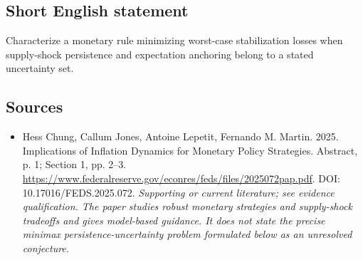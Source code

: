\documentclass[11pt]{article}
\begin{document}
\subsection{Short English statement}
Characterize a monetary rule minimizing worst-case stabilization losses when supply-shock persistence and expectation anchoring belong to a stated uncertainty set.

\subsection{Sources}
\begin{itemize}\raggedright
\item[\textnormal{[S1]}]\hypertarget{source:30007529:1}{} Hess Chung, Callum Jones, Antoine Lepetit, Fernando M. Martin. 2025. Implications of Inflation Dynamics for Monetary Policy Strategies. Abstract, p. 1; Section 1, pp. 2–3.
\url{https://www.federalreserve.gov/econres/feds/files/2025072pap.pdf}.
DOI: 10.17016/FEDS.2025.072.
{\small\textit{Supporting or current literature; see evidence qualification. The paper studies robust monetary strategies and supply-shock tradeoffs and gives model-based guidance. It does not state the precise minimax persistence-uncertainty problem formulated below as an unresolved conjecture.}}
\end{itemize}
\end{document}
